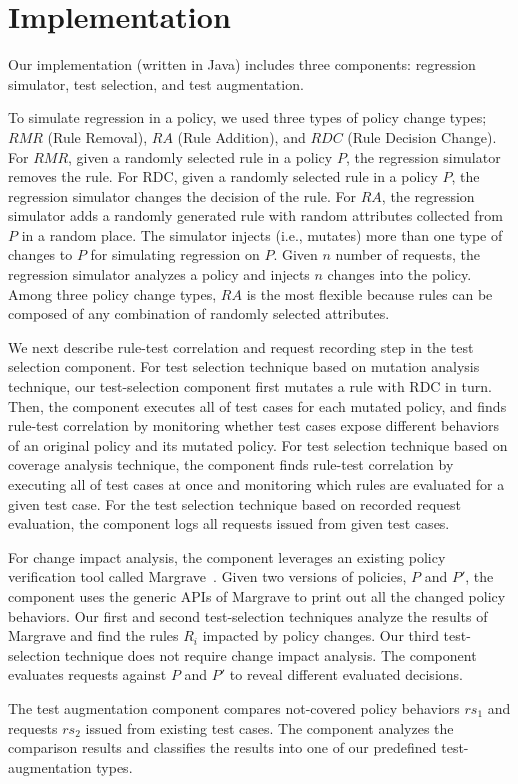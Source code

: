 \section{Implementation} \label{sec:implementation}

Our implementation (written in Java) includes three components: regression simulator, test selection,
and test augmentation.

To simulate regression in a policy, 
we used three types of policy change types; $RMR$ (Rule Removal), $RA$ (Rule Addition), and $RDC$ (Rule Decision Change). For $RMR$, given a randomly selected rule in a policy $P$,
the regression simulator removes the rule. For RDC,
given a randomly selected rule in a policy $P$, the regression simulator changes
the decision of the rule.
For $RA$, the regression simulator adds a randomly generated
rule with random attributes collected from $P$ in a random place.
The simulator injects (i.e., mutates) more than one type of changes to $P$ for simulating
regression on $P$.
Given $n$ number of requests, the regression simulator analyzes a policy and injects $n$ changes
into the policy. Among three policy change types, $RA$ is the most flexible
because rules can be composed of any combination of randomly selected attributes.

We next describe rule-test correlation and request recording step in the test selection
component. 
For test selection technique based on mutation analysis technique,
our test-selection component first mutates a rule with RDC in turn. 
Then, the component executes all of test cases for each mutated policy, and
finds rule-test correlation by monitoring 
whether test cases expose different behaviors of an original policy and its mutated policy.
For test selection technique based on coverage analysis technique,
the component finds rule-test correlation by executing all of test cases at once and monitoring
which rules are evaluated for a given test case. For the test selection technique based on recorded request evaluation,
the component logs all requests issued from given test cases.

For change impact analysis, the component leverages an existing policy verification tool called Margrave~\cite{fisler05:verification}. 
Given two versions of policies, $P$ and $P'$, 
the component uses the generic APIs of Margrave to
print out all the changed policy behaviors.
Our first and second test-selection techniques analyze the results of Margrave and
find the rules $R_i$ impacted by policy changes.
Our third test-selection technique does not require change impact analysis. The
component evaluates requests against $P$ and $P'$ to reveal different evaluated decisions.

The test augmentation component compares
not-covered policy behaviors $rs_1$ and requests $rs_2$ issued
from existing test cases. The component analyzes the comparison results and classifies
the results into one of our predefined test-augmentation types. 
 



